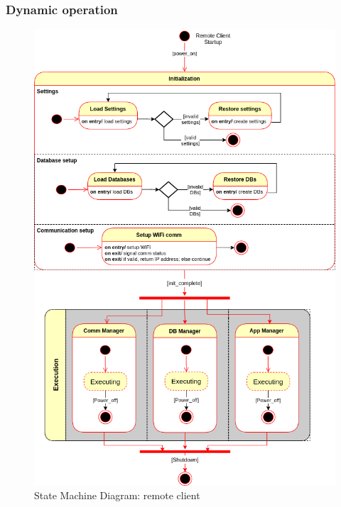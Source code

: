 \subsubsection{Dynamic operation}
\label{sec:dyn-oper-1}
%
\begin{figure}[htb!]
\centering
    \includegraphics[width=0.9\columnwidth]{./img/state-mach-rc.png}
  \caption{State Machine Diagram: remote client}%
\label{fig:state-mach-rc}
\end{figure}
%
